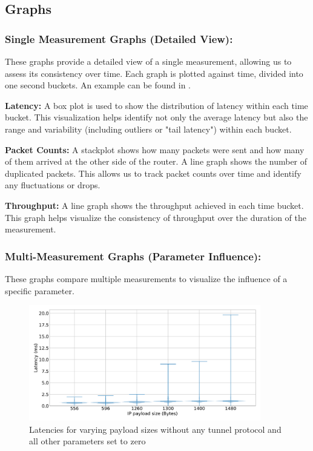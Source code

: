 \subsection{Graphs}
\subsubsection{Single Measurement Graphs (Detailed View):}
\label{sect:graphs-single}
These graphs provide a detailed view of a single measurement, allowing us to assess its consistency over time.
Each graph is plotted against time, divided into one second buckets.
An example can be found in .

\noindent\textbf{Latency:} A box plot is used to show the distribution of latency within each time bucket.
This visualization helps identify not only the average latency but also the range and variability (including outliers or "tail latency") within each bucket.

\noindent\textbf{Packet Counts:} A stackplot shows how many packets were sent and how many of them arrived at the other side of the router.
A line graph shows the number of duplicated packets.
This allows us to track packet counts over time and identify any fluctuations or drops.

\noindent\textbf{Throughput:} A line graph shows the throughput achieved in each time bucket.
This graph helps visualize the consistency of throughput over the duration of the measurement.


\subsubsection{Multi-Measurement Graphs (Parameter Influence):}
\label{sect:graphs-multi}
These graphs compare multiple measurements to visualize the influence of a specific parameter.

\begin{figure}[tbh]
	\centering
	\includegraphics[draft=false,width=0.9\textwidth]{figures/Graphs/graph-4-mtu/latencies.pdf}
	\caption{Latencies for varying payload sizes without any tunnel protocol and all other parameters set to zero}
	\label{fig:graph-4-mtu-latencies}
\end{figure}

